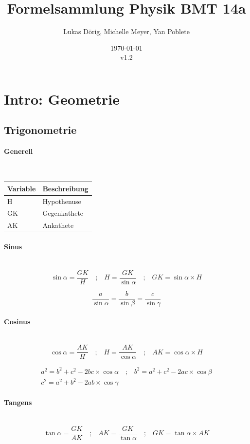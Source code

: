 \documentclass[a4paper,10pt]{article}
\title{Formelsammlung Physik BMT 14a}
\author{Lukas Dörig, Michelle Meyer, Yan Poblete}
\date{\today\\v1.2}
\newcommand{\lbparagraph}[1]{\paragraph{#1}\mbox{}\\}
\newcommand{\eqsp}[1]{\quad\textbf{;}\quad}
\begin{document}
\maketitle

\tableofcontents

\pagebreak

\section*{Intro: Geometrie}

\subsection*{Trigonometrie}

\lbparagraph{Generell}

\begin{tabular}{l|l}
    Variable & Beschreibung \\
    \hline
    H & Hypothenuse \\
    GK & Gegenkathete \\
    AK & Ankathete
\end{tabular}

\lbparagraph{Sinus}

\begin{equation}
    \sin{\alpha} = \frac{GK}{H}
    \eqsp{}
    H = \frac{GK}{\sin{\alpha}}
    \eqsp{}
    GK = \sin{\alpha} \times H
\end{equation}

\begin{equation}
    \frac{a}{\sin{\alpha}} = \frac{b}{\sin{\beta}} = \frac{c}{\sin{\gamma}}
\end{equation}

\lbparagraph{Cosinus}

\begin{equation}
    \cos{\alpha} = \frac{AK}{H}
    \eqsp{}
    H = \frac{AK}{\cos{\alpha}}
    \eqsp{}
    AK = \cos{\alpha} \times H
\end{equation}

\begin{gather}
    a^2 = b^2 + c^2 - 2bc \times \cos{\alpha}
    \eqsp{}
    b^2 = a^2 + c^2 - 2ac \times \cos{\beta}
    \\
    c^2 = a^2 + b^2 - 2ab \times \cos{\gamma}
\end{gather}

\lbparagraph{Tangens}

\begin{equation}
    \tan{\alpha} = \frac{GK}{AK}
    \eqsp{}
    AK = \frac{GK}{\tan{\alpha}}
    \eqsp{}
    GK = \tan{\alpha} \times AK
\end{equation}
\end{document}

